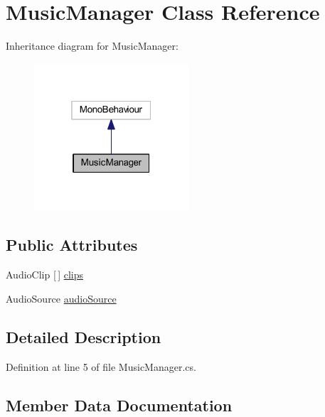 \hypertarget{class_music_manager}{}\section{Music\+Manager Class Reference}
\label{class_music_manager}


Inheritance diagram for Music\+Manager\+:
\nopagebreak
\begin{figure}[H]
\begin{center}
\leavevmode
\includegraphics[width=163pt]{class_music_manager__inherit__graph}
\end{center}
\end{figure}
\subsection*{Public Attributes}
\begin{DoxyCompactItemize}
\item 
Audio\+Clip \mbox{[}$\,$\mbox{]} \hyperlink{class_music_manager_a148545cd355044db2b30aae30b678e95}{clips}
\item 
Audio\+Source \hyperlink{class_music_manager_a1c16d18fde1107fe755075dc84b92803}{audio\+Source}
\end{DoxyCompactItemize}


\subsection{Detailed Description}


Definition at line 5 of file Music\+Manager.\+cs.



\subsection{Member Data Documentation}
\mbox{\label{class_music_manager_a1c16d18fde1107fe755075dc84b92803}} 

